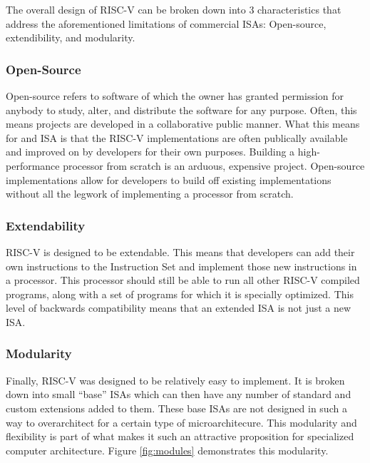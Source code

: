 
    The overall design of RISC-V can be broken down into 3 characteristics that address the aforementioned limitations of commercial \glspl{ISA}: Open-source, extendibility, and modularity.

    \subsubsection{Open-Source}
        Open-source refers to software of which the owner has granted permission for anybody to study, alter, and distribute the software for any purpose. Often, this means projects are developed in a collaborative public manner. What this means for and ISA is that the RISC-V implementations are often publically available and improved on by developers for their own purposes. Building a high-performance processor from scratch is an arduous, expensive project. Open-source implementations allow for developers to build off existing implementations without all the legwork of implementing a processor from scratch.

    \subsubsection{Extendability}
        RISC-V is designed to be extendable. This means that developers can add their own instructions to the Instruction Set and implement those new instructions in a processor. This processor should still be able to run all other RISC-V compiled programs, along with a set of programs for which it is specially optimized. This level of backwards compatibility means that an extended ISA is not just a new ISA. 

    \subsubsection{Modularity}
        Finally, RISC-V was designed to be relatively easy to implement. It is broken down into small ``base'' \glspl{ISA} which can then have any number of standard and custom extensions added to them. These base ISAs are not designed in such a way to overarchitect for a certain type of microarchitecure. This modularity and flexibility is part of what makes it such an attractive proposition for specialized computer architecture. Figure \ref{fig:modules} demonstrates this modularity.

        

